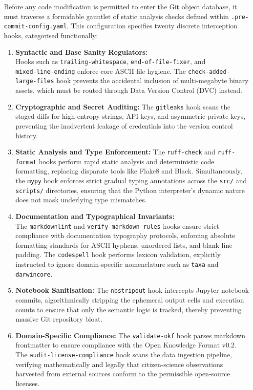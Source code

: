 Before any code modification is permitted to enter the Git object database, it must traverse a formidable gauntlet of static analysis checks defined within \texttt{.pre-commit-config.yaml}. This configuration specifies twenty discrete interception hooks, categorised functionally:
\begin{enumerate}
    \item \textbf{Syntactic and Base Sanity Regulators:}\\Hooks such as \texttt{trailing-whitespace}, \texttt{end-of-file-fixer}, and\\\texttt{mixed-line-ending} enforce core ASCII file hygiene. The \texttt{check-added-large-files} hook prevents the accidental inclusion of multi-megabyte binary assets, which must be routed through Data Version Control (DVC) instead.
    \item \textbf{Cryptographic and Secret Auditing:} The \texttt{gitleaks} hook scans the staged diffs for high-entropy strings, API keys, and asymmetric private keys, preventing the inadvertent leakage of credentials into the version control history.
    \item \textbf{Static Analysis and Type Enforcement:} The \texttt{ruff-check} and \texttt{ruff-format} hooks perform rapid static analysis and deterministic code formatting, replacing disparate tools like Flake8 and Black. Simultaneously, the \texttt{mypy} hook enforces strict gradual typing annotations across the \texttt{src/} and \texttt{scripts/} directories, ensuring that the Python interpreter's dynamic nature does not mask underlying type mismatches.
    \item \textbf{Documentation and Typographical Invariants:}\\The \texttt{markdownlint} and \texttt{verify-markdown-rules} hooks ensure strict compliance with documentation typography protocols, enforcing absolute formatting standards for ASCII hyphens, unordered lists, and blank line padding. The \texttt{codespell} hook performs lexicon validation, explicitly instructed to ignore domain-specific nomenclature such as \texttt{taxa} and \texttt{darwincore}.
    \item \textbf{Notebook Sanitisation:} The \texttt{nbstripout} hook intercepts Jupyter notebook commits, algorithmically stripping the ephemeral output cells and execution counts to ensure that only the semantic logic is tracked, thereby preventing massive Git repository bloat.
    \item \textbf{Domain-Specific Compliance:} The \texttt{validate-okf} hook parses markdown frontmatter to ensure compliance with the Open Knowledge Format v0.2. The \texttt{audit-license-compliance} hook scans the data ingestion pipeline, verifying mathematically and legally that citizen-science observations harvested from external sources conform to the permissible open-source licenses.

\end{enumerate}
